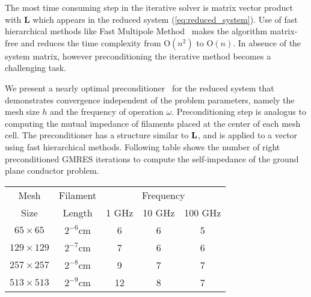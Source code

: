 \documentclass{report}
\begin{document}
The most time consuming step in the iterative solver is matrix vector
product with {\bf L} which appears in the reduced system
(\ref{eq:reduced_system}). Use of fast hierarchical methods like Fast
Multipole Method~\cite{fmm} makes the algorithm matrix-free and reduces
the time complexity from O$(n^2)$ to O$(n)$. In absence of the system
matrix, however preconditioning the iterative method becomes a
challenging task.

We present a nearly optimal preconditioner~\cite{dac} for the reduced
system that demonstrates convergence independent of the problem
parameters, namely the mesh size $h$ and the frequency of operation
$\omega$. Preconditioning step is analogus to computing the mutual
impedance of filaments placed at the center of each mesh cell. The
preconditioner has a structure similar to ${\bf L}$, and is applied to a
vector using fast hierarchical methods. Following table shows the number
of right preconditioned GMRES iterations to compute the self-impedance of
the ground plane conductor problem.
\begin{center}
\begin{tabular}{|c|c|c|c|c|} \hline
{Mesh} & {Filament} & \multicolumn {3}{|c|}{Frequency}\\
\cline{3-5}
{Size} & {Length} & 1 GHz & 10 GHz & 100 GHz \\ \hline
$65 \times 65$ & $2^{-6}$cm & 6 & 6 & 5 \\ \hline
$129 \times 129$ & $2^{-7}$cm & 7 & 6 & 6 \\ \hline
$257 \times 257$ & $2^{-8}$cm & 9 & 7 & 7 \\ \hline
$513 \times 513$ & $2^{-9}$cm & 12 & 8 & 7 \\ \hline
\end{tabular}
\end{center}
\end{document}
